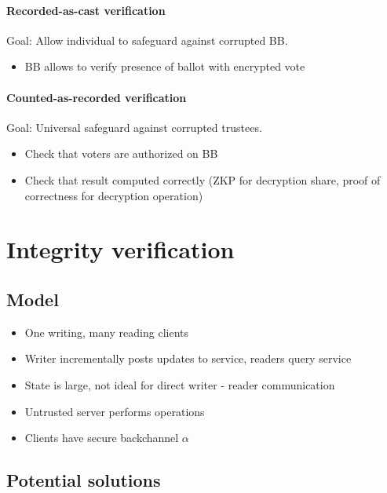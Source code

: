 \paragraph{Recorded-as-cast verification}

Goal: Allow individual to safeguard against corrupted BB.

\begin{itemize}
		\item BB allows to verify presence of ballot with encrypted vote
\end{itemize}

\paragraph{Counted-as-recorded verification}

Goal: Universal safeguard against corrupted trustees.

\begin{itemize}
		\item Check that voters are authorized on BB
		\item Check that result computed correctly (ZKP for decryption share,
				proof of correctness for decryption operation)
\end{itemize}

\section{Integrity verification}

\subsection{Model}

\begin{itemize}
		\item One writing, many reading clients
		\item Writer incrementally posts updates to service, readers query service
		\item State is large, not ideal for direct writer - reader communication
		\item Untrusted server performs operations
		\item Clients have secure backchannel $\alpha$
\end{itemize}

\subsection{Potential solutions}

